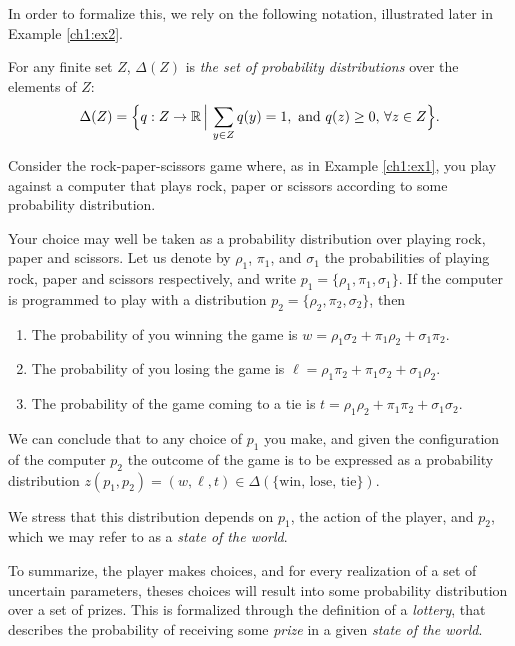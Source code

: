 In order to formalize this, we rely on the following notation, illustrated later in Example \ref{ch1:ex2}.
\begin{notation}[$\Delta$]
For any finite set $Z$, $\Delta(Z)$ is \emph{the set of probability distributions} over the elements of $Z$:
$$ \Delta(Z) = \Big \{q : Z \rightarrow \mathbb{R} \, \Big | \, \sum_{y \in Z} q(y) = 1,
\text{ and }  q(z) \geq 0 ,\, \forall z \in Z \Big \}.$$
\end{notation}

\begin{example}
\label{ch1:ex2}

Consider the rock-paper-scissors game where, as in Example \ref{ch1:ex1}, you play against a computer that plays rock, paper or scissors according to some probability distribution.

Your choice may well be taken as a probability distribution over playing rock, paper and scissors.
Let us denote by $\rho_1$, $\pi_1$, and $\sigma_1$ the probabilities of playing rock, paper and scissors respectively, and write $p_1 = \{\rho_1, \pi_1, \sigma_1\}$.
If the computer is programmed to play with a distribution
$p_2 = \{\rho_2,  \pi_2, \sigma_2\}$, then
\begin{enumerate}
\item The probability of you winning the game is
$w = \rho_1 \sigma_2 + \pi_1 \rho_2 + \sigma_1 \pi_2.$
\item The probability of you losing the game is
$\ell = \rho_1 \pi_2 + \pi_1 \sigma_2 + \sigma_1 \rho_2.$
\item The probability of the game coming to a tie is
$t = \rho_1 \rho_2 + \pi_1 \pi_2 + \sigma_1 \sigma_2.$
\end{enumerate}
We can conclude that to any choice of $p_1$ you make, and given the configuration of the computer $p_2$ the outcome of the game is to be expressed as a probability distribution $z(p_1, p_2) = (w, \ell, t) \in \Delta(\{\text{win, lose, tie}\})$.

We stress that this distribution depends on $p_1$, the action of the player, and $p_2$, which we may refer to as a \emph{state of the world}.
\end{example}



To summarize, the player makes choices, and for every realization of a set of uncertain parameters, theses choices will result into some probability distribution over a set of prizes. This is formalized through the definition of a \emph{lottery},  that describes the probability of receiving some \emph{prize} in a given \emph{state of the world}.

